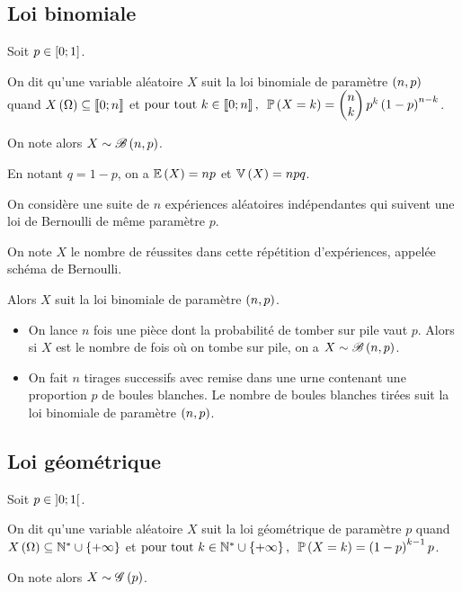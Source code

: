 \subsection{Loi binomiale}

\begin{defi}
Soit \(p\in\left[0;1\right]\).

On dit qu'une variable aléatoire \(X\) suit la loi binomiale de paramètre \(\left(n,p\right)\) quand \(X\left(\Omega\right)\subseteq\left\llbracket0;n\right\rrbracket\) et \(\quantifs{\tpt k\in\interventierii{0}{n}}\proba{X=k}=\binom{k}{n}p^k\paren{1-p}^{n-k}\).

On note alors \(X\sim\mathscr{B}\left(n,p\right)\).
\end{defi}

En notant \(q=1-p\), on a \(\operatorname{\mathbb{E}}\left(X\right)=np\) et \(\operatorname{\mathbb{V}}\left(X\right)=npq\).

\begin{prop}
On considère une suite de \(n\) expériences aléatoires indépendantes qui suivent une loi de Bernoulli de même paramètre \(p\).

On note \(X\) le nombre de réussites dans cette répétition d'expériences, appelée schéma de Bernoulli.

Alors \(X\) suit la loi binomiale de paramètre \(\left(n,p\right)\).
\end{prop}

\begin{ex}
\begin{itemize}
    \item On lance \(n\) fois une pièce dont la probabilité de tomber sur pile vaut \(p\). Alors si \(X\) est le nombre de fois où on tombe sur pile, on a \(X\sim\mathscr{B}\left(n,p\right)\). \\
    \item On fait \(n\) tirages successifs avec remise dans une urne contenant une proportion \(p\) de boules blanches. Le nombre de boules blanches tirées suit la loi binomiale de paramètre \(\left(n,p\right)\).
\end{itemize}
\end{ex}

\subsection{Loi géométrique}

\begin{defi}
Soit \(p\in\left]0;1\right[\).

On dit qu'une variable aléatoire \(X\) suit la loi géométrique de paramètre \(p\) quand \(X\left(\Omega\right)\subseteq\mathbb{N}^*\cup\left\lbrace+\infty\right\rbrace\) et \(\quantifs{\tpt k\in\Ns\union\accol{\pinf}}\proba{X=k}=\paren{1-p}^{k-1}p\).

On note alors \(X\sim\mathscr{G}\left(p\right)\).
\end{defi}

